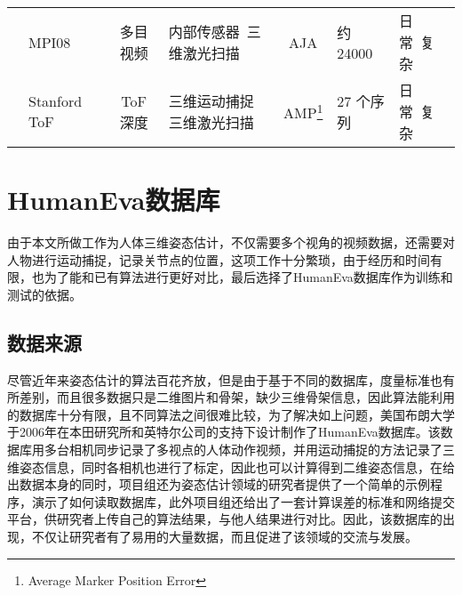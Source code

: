 \begin{table}[htbp]
\begin{minipage}[t]{\linewidth}
\begin{tabular}{c|p{7em}<{\centering}cp{6em}<{\centering}cp{5em}<{\centering}p{3em}<{\centering}}
      & MPI08~\cite{pons2010multisensor} & 多目视频 & 内部传感器\ 三维激光扫描 & AJA & 约24000 & 日常\ 复杂\\
      & Stanford ToF~\cite{ganapathi2010real} & ToF 深度 & 三维运动捕捉 三维激光扫描 & AMP\footnote{Average Marker Position Error} & 27 个序列 & 日常\ 复杂\\
      \bottomrule[1.5pt]
    \end{tabular}
    \end{minipage}
\end{table}

\section{HumanEva数据库}
\label{sec:HumanEva}
由于本文所做工作为人体三维姿态估计，不仅需要多个视角的视频数据，还需要对人物进行运动捕捉，记录关节点的位置，这项工作十分繁琐，由于经历和时间有限，也为了能和已有算法进行更好对比，最后选择了HumanEva数据库作为训练和测试的依据。
\subsection{数据来源}
尽管近年来姿态估计的算法百花齐放，但是由于基于不同的数据库，度量标准也有所差别，而且很多数据只是二维图片和骨架，缺少三维骨架信息，因此算法能利用的数据库十分有限，且不同算法之间很难比较，为了解决如上问题，美国布朗大学于2006年在本田研究所和英特尔公司的支持下设计制作了HumanEva数据库。该数据库用多台相机同步记录了多视点的人体动作视频，并用运动捕捉的方法记录了三维姿态信息，同时各相机也进行了标定，因此也可以计算得到二维姿态信息，在给出数据本身的同时，项目组还为姿态估计领域的研究者提供了一个简单的示例程序，演示了如何读取数据库，此外项目组还给出了一套计算误差的标准和网络提交平台，供研究者上传自己的算法结果，与他人结果进行对比。因此，该数据库的出现，不仅让研究者有了易用的大量数据，而且促进了该领域的交流与发展。

